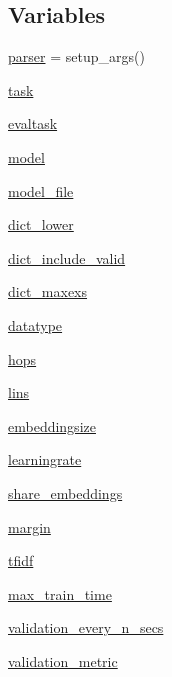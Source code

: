 \subsection*{Variables}
\begin{DoxyCompactItemize}
\item 
\hyperlink{namespacetrain_a242e49c387b90838a9072c79886a10ec}{parser} = setup\+\_\+args()
\item 
\hyperlink{namespacetrain_ab147c18a1adffb88116dd83812304ac7}{task}
\item 
\hyperlink{namespacetrain_acb7f4a3a66aa0f5aac1fb5bde04c56a7}{evaltask}
\item 
\hyperlink{namespacetrain_a943b3c8a55b8e52ba14f9b59e14840d2}{model}
\item 
\hyperlink{namespacetrain_a1105bc0f8416050a6e26140c97dfe1bf}{model\+\_\+file}
\item 
\hyperlink{namespacetrain_a8f388ab3a8a1091473346480c48acbc3}{dict\+\_\+lower}
\item 
\hyperlink{namespacetrain_a551340b6e8d5e71fd5ead93e3a72bf88}{dict\+\_\+include\+\_\+valid}
\item 
\hyperlink{namespacetrain_a56484b89af2c1d6e749bd8e696bad1d3}{dict\+\_\+maxexs}
\item 
\hyperlink{namespacetrain_ae42fa60655eba8aba94b03539cccf9cb}{datatype}
\item 
\hyperlink{namespacetrain_a6778555638afb2529f4818fda80d9fd6}{hops}
\item 
\hyperlink{namespacetrain_ae4aaa73ae0ad421183d4ab36f0d8fc8e}{lins}
\item 
\hyperlink{namespacetrain_a9f48b0b5e52b38ed4a74e4a7b5a4387a}{embeddingsize}
\item 
\hyperlink{namespacetrain_abb1ef436e0c9358251dab8f43b5eaf55}{learningrate}
\item 
\hyperlink{namespacetrain_a781c403aaa147370f9f172ce4f85323e}{share\+\_\+embeddings}
\item 
\hyperlink{namespacetrain_a543bbe86c3259fb3c872266fd985a87e}{margin}
\item 
\hyperlink{namespacetrain_ac53cf81dd9f6ec5ae1b3b18b036c3679}{tfidf}
\item 
\hyperlink{namespacetrain_adef31c34753713d14a20eb6f1c478f3d}{max\+\_\+train\+\_\+time}
\item 
\hyperlink{namespacetrain_a18ecadee82c97099a6c6e89cc8ba7532}{validation\+\_\+every\+\_\+n\+\_\+secs}
\item 
\hyperlink{namespacetrain_ab5566e4b237deb20dd8bcece26329c84}{validation\+\_\+metric}

\end{DoxyCompactItemize}
